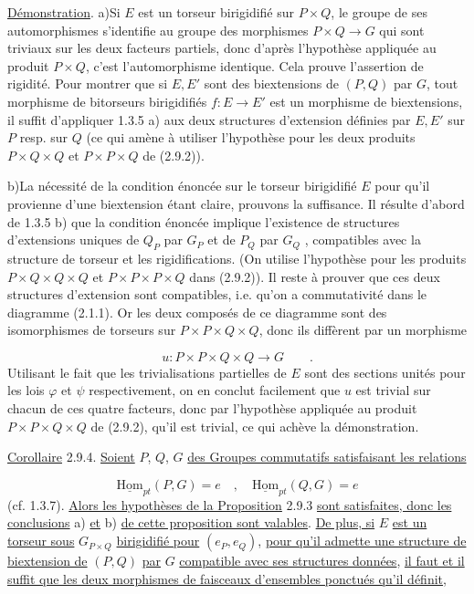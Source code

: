 \underline{Démonstration}. a)\quad Si $E$ est un torseur birigidifié sur $P\times Q$, le groupe de ses automorphismes s'identifie au groupe des morphismes $P\times Q \longrightarrow G$ qui sont triviaux sur les deux facteurs partiels, donc d'après l'hypothèse appliquée au produit $P\times Q$, c'est l'automorphisme identique. Cela prouve l'assertion de rigidité. Pour montrer que si $E,E'$ sont des biextensions de $(P,Q)$ par $G$, tout morphisme de bitorseurs birigidifiés $f : E \longrightarrow E'$ est un morphisme de biextensions, il suffit d'appliquer 1.3.5 a) aux deux structures d'extension définies par $E,E'$ sur $P$ resp. sur $Q$ (ce qui amène à utiliser l'hypothèse pour les deux produits $P\times Q\times Q$ et $P\times P\times Q$ de (2.9.2)).

b)\quad La nécessité de la condition énoncée sur le torseur birigidifié $E$ pour qu'il provienne d'une biextension étant claire, prouvons la suffisance. Il résulte d'abord de 1.3.5 b) que la condition énoncée implique l'existence de structures d'extensions uniques de $Q_P$ par $G_P$ et de $P_Q$ par $G_Q$ , compatibles avec la structure de torseur et les rigidifications. (On utilise l'hypothèse pour les produits $P\times Q\times Q\times Q$ et $P\times P\times P\times Q$
dans (2.9.2)). Il reste à prouver que ces deux structures d'extension sont compatibles, i.e. qu'on a commutativité dans le diagramme (2.1.1). Or les deux composés de ce diagramme sont des isomorphismes de torseurs sur $P\times P\times Q\times Q$, donc ils diffèrent par un morphisme

\begin{equation*}
u : P\times P\times Q\times Q \longrightarrow G \qquad .
\end{equation*}
Utilisant le fait que les trivialisations partielles de $E$ sont des sections unités pour les lois $\varphi$ et $\psi$ respectivement, on en conclut facilement que $u$ est trivial sur chacun de ces quatre facteurs, donc par l'hypothèse appliquée au produit $P\times P\times Q\times Q$ de (2.9.2), qu'il est trivial, ce qui achève la démonstration.

\underline{Corollaire} 2.9.4. \underline{Soient} $P$, $Q$, $G$ \underline{des Groupes commutatifs satisfaisant les relations}

\begin{equation}\tag{2.9.4.1}
\underline{\mathrm{Hom}}_{pt}(P,G) = e \quad , \quad \underline{\mathrm{Hom}}_{pt}(Q,G) = e
\end{equation}
(cf. 1.3.7). \underline{Alors les hypothèses de la Proposition} 2.9.3 \underline{sont satisfaites, donc les conclusions} a) \underline{et} b) \underline{de cette proposition sont valables}. \underline{De plus, si} $E$ \underline{est un torseur sous} $G_{P\times Q}$ \underline{birigidifié pour} $(e_P,e_Q)$, \underline{pour qu'il admette une structure de biextension de} $(P,Q)$ \underline{par} $G$ \underline{compatible avec ses structures données}, \underline{il faut et il suffit que les deux morphismes de faisceaux d'ensembles ponctués qu'il définit},

